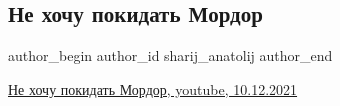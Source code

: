  
 
 
 
 
 
\subsection{Не хочу покидать Мордор}
\label{sec:10_12_2021.fb.sharij_anatolij.1.ne_hochu_pokidat_mordor}
 
\ifcmt
 author_begin
   author_id sharij_anatolij
 author_end
\fi

\href{https://www.youtube.com/watch?v=xKZb5-z6h5Q}{Не хочу покидать Мордор, youtube, 10.12.2021}

